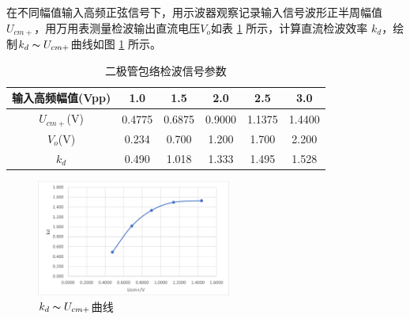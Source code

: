\documentclass[UTF8]{ctexart}
\begin{document}
\vspace{-1em}
在不同幅值输入高频正弦信号下，用示波器观察记录输入信号波形正半周幅值$U_{cm+}$，用万用表测量检波输出直流电压$V_o$如表 \ref{tab:5} 所示，计算直流检波效率 $k_d$，绘制$k_d\thicksim U_{cm+}$曲线如图 \ref{fig:42} 所示。
\begin{table}[H]
    \centering
    \vspace{-1em}
    \caption{二极管包络检波信号参数}
    \label{tab:5}
    \begin{tabular}{c|c|c|c|c|c}
    \hline
    输入高频幅值(Vpp)  & 1.0    & 1.5    & 2.0    & 2.5    & 3.0    \\ \hline
    $U_{cm+}$(V) & 0.4775 & 0.6875 & 0.9000 & 1.1375 & 1.4400 \\ \hline
    $V_o$(V)     & 0.234  & 0.700  & 1.200  & 1.700  & 2.200  \\ \hline
    $k_d$        & 0.490  & 1.018  & 1.333  & 1.495  & 1.528  \\ \hline
    \end{tabular}
\end{table}
\begin{figure}[H]
    \centering
    \includegraphics[width=0.57\textwidth]{pics/42.png}
    \caption{$k_d\thicksim U_{cm+}$曲线}\label{fig:42}
\end{figure}
\end{document}
